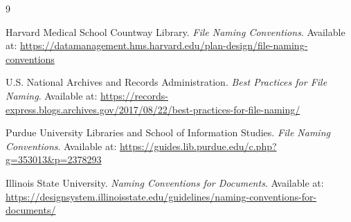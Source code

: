 \documentclass[11pt,letterpaper]{article}
\begin{document}
{\small\sloppy
\begin{thebibliography}{9}

Harvard Medical School Countway Library.
\newblock \emph{File Naming Conventions}.
\newblock Available at: \url{https://datamanagement.hms.harvard.edu/plan-design/file-naming-conventions}

U.S. National Archives and Records Administration.
\newblock \emph{Best Practices for File Naming}.
\newblock Available at: \url{https://records-express.blogs.archives.gov/2017/08/22/best-practices-for-file-naming/}

Purdue University Libraries and School of Information Studies.
\newblock \emph{File Naming Conventions}.
\newblock Available at: \url{https://guides.lib.purdue.edu/c.php?g=353013&p=2378293}

Illinois State University.
\newblock \emph{Naming Conventions for Documents}.
\newblock Available at: \url{https://designsystem.illinoisstate.edu/guidelines/naming-conventions-for-documents/}

\end{thebibliography}
}
\end{document}
